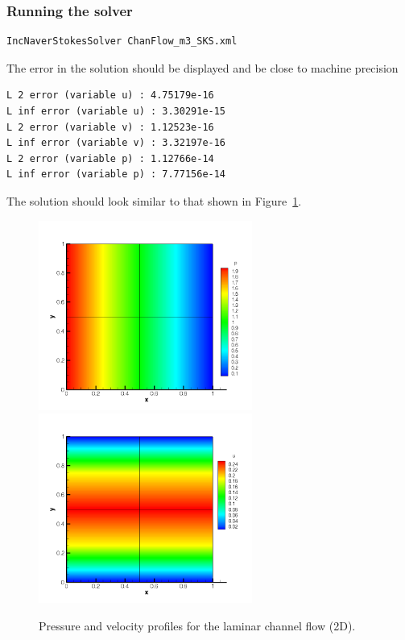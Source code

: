 \subsubsection{Running the solver}
\begin{lstlisting}[style=BashInputStyle]
IncNaverStokesSolver ChanFlow_m3_SKS.xml
\end{lstlisting}

The error in the solution should be displayed and be close to machine precision
\begin{lstlisting}[style=BashInputStyle]
L 2 error (variable u) : 4.75179e-16
L inf error (variable u) : 3.30291e-15
L 2 error (variable v) : 1.12523e-16
L inf error (variable v) : 3.32197e-16
L 2 error (variable p) : 1.12766e-14
L inf error (variable p) : 7.77156e-14
\end{lstlisting}

The solution should look similar to that shown in
Figure~\ref{f:incns:laminar2d}.

\begin{figure}
\begin{center}
\includegraphics[width=7cm]{Figures/CF2DSKP3PR.png}
\includegraphics[width=7cm]{Figures/CF2DSKP3.png}
\caption{Pressure and velocity profiles for the laminar channel flow (2D).}
\label{f:incns:laminar2d}
\end{center}
\end{figure}



